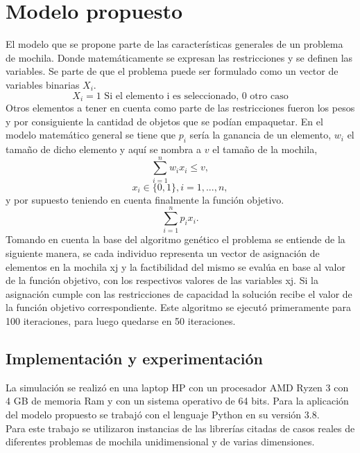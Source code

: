 \documentclass[3pt,twocolumn]{elsarticle}
\begin{document}
\section{Modelo propuesto}
El modelo que se propone parte de las características generales de un problema de mochila. Donde matemáticamente se expresan las restricciones y se definen las variables. Se parte de que el problema puede ser formulado como un vector de variables binarias $X_i$.
\begin{equation}
	X_i = \text{1 Si el elemento i es seleccionado, 0 otro caso}  
\end{equation} 
Otros elementos a tener en cuenta como parte de las restricciones fueron los pesos y por consiguiente la cantidad de objetos que se podían empaquetar. En el modelo matemático general se tiene que $p_i$ sería la ganancia de un elemento, $w_i$ el tamaño de dicho elemento y aquí se nombra a $v$ el tamaño de la mochila,
\begin{equation}
	\sum_{i=1}^{n} w_i x_i \leq v,
\end{equation}
\begin{equation}
	 x_i \in \{0,1\}, i = 1, ..., n ,
\end{equation}
y por supuesto teniendo en cuenta finalmente la función objetivo.
\begin{equation}
	\sum_{i=1}^{n} p_i x_i.
\end{equation}
Tomando en cuenta la base del algoritmo genético \cite{satu} el problema se entiende de la siguiente manera,  se cada individuo representa un vector de asignación de elementos en la mochila xj y la factibilidad del mismo se evalúa en base al valor de la función objetivo, con los respectivos valores de las variables xj. Si la asignación cumple con las restricciones de capacidad la solución recibe el valor de la función objetivo correspondiente. 
Este algoritmo se ejecutó primeramente para 100 iteraciones, para luego quedarse en 50 iteraciones.
\subsection{Implementación y experimentación}
La simulación se realizó en una laptop HP con un procesador AMD Ryzen 3 con 4 GB de memoria Ram y con un sistema operativo de 64 bits. Para la aplicación del modelo propuesto se trabajó con el lenguaje Python en su versión 3.8. \\ 
Para este trabajo se utilizaron instancias de las librerías citadas \cite{beasley} de casos reales de diferentes problemas de mochila unidimensional y de varias dimensiones. 
 
\end{document}
